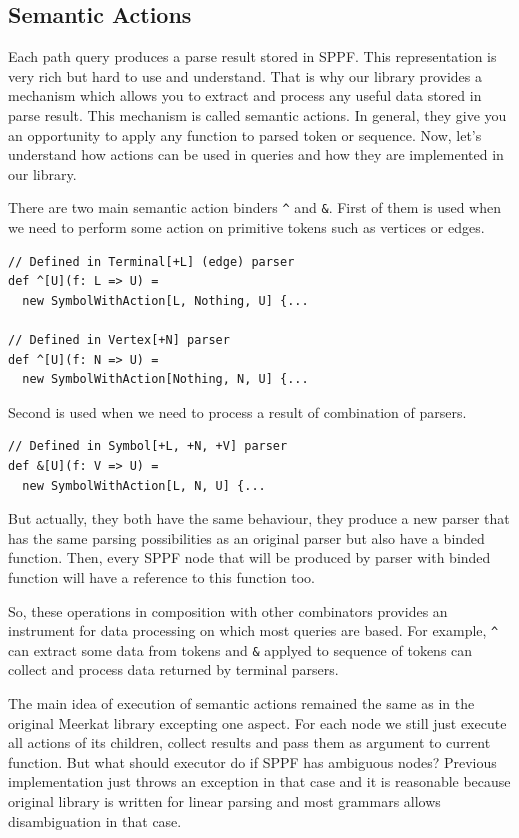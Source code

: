 \subsection{Semantic Actions}
\label{sec:semanticActions}
Each path query produces a parse result stored in SPPF.
This representation is very rich but hard to use and understand.
That is why our library provides a mechanism which allows you to extract and process any useful data stored in parse result.
This mechanism is called semantic actions.
In general, they give you an opportunity to apply any function to parsed token or sequence.
Now, let's understand how actions can be used in queries and how they are implemented in our library.

There are two main semantic action binders \lstinline{^} and \lstinline{&}.
First of them is used when we need to perform some action on primitive tokens such as vertices or edges.
\begin{lstlisting}
// Defined in Terminal[+L] (edge) parser
def ^[U](f: L => U) = 
  new SymbolWithAction[L, Nothing, U] {...
  
// Defined in Vertex[+N] parser
def ^[U](f: N => U) = 
  new SymbolWithAction[Nothing, N, U] {...
\end{lstlisting}

Second is used when we need to process a result of combination of parsers.
\begin{lstlisting}
// Defined in Symbol[+L, +N, +V] parser
def &[U](f: V => U) = 
  new SymbolWithAction[L, N, U] {...
\end{lstlisting}

But actually, they both have the same behaviour, they produce a new parser that has the same parsing possibilities as an original parser but also have a binded function.
Then, every SPPF node that will be produced by parser with binded function will have a reference to this function too.

So, these operations in composition with other combinators provides an instrument for data processing on which most queries are based. 
For example, \lstinline{^} can extract some data from tokens and \lstinline{&} applyed to sequence of tokens can collect and process data returned by terminal parsers.

The main idea of execution of semantic actions remained the same as in the original Meerkat library excepting one aspect.
For each node we still just execute all actions of its children, collect results and pass them as argument to current function.
But what should executor do if SPPF has ambiguous nodes? 
Previous implementation just throws an exception in that case and it is reasonable because original library is written for linear parsing and most grammars allows disambiguation in that case.

